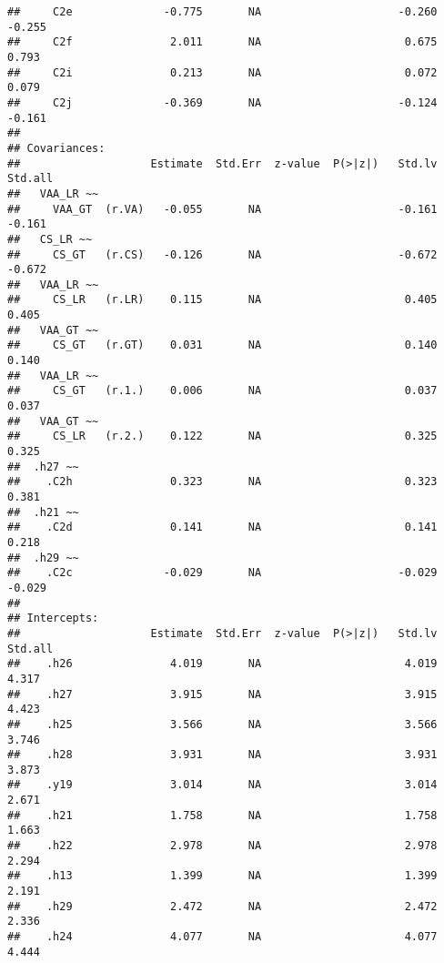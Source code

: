\documentclass[
]{article}
\begin{document}
\begin{verbatim}
##     C2e              -0.775       NA                     -0.260   -0.255
##     C2f               2.011       NA                      0.675    0.793
##     C2i               0.213       NA                      0.072    0.079
##     C2j              -0.369       NA                     -0.124   -0.161
## 
## Covariances:
##                    Estimate  Std.Err  z-value  P(>|z|)   Std.lv  Std.all
##   VAA_LR ~~                                                             
##     VAA_GT  (r.VA)   -0.055       NA                     -0.161   -0.161
##   CS_LR ~~                                                              
##     CS_GT   (r.CS)   -0.126       NA                     -0.672   -0.672
##   VAA_LR ~~                                                             
##     CS_LR   (r.LR)    0.115       NA                      0.405    0.405
##   VAA_GT ~~                                                             
##     CS_GT   (r.GT)    0.031       NA                      0.140    0.140
##   VAA_LR ~~                                                             
##     CS_GT   (r.1.)    0.006       NA                      0.037    0.037
##   VAA_GT ~~                                                             
##     CS_LR   (r.2.)    0.122       NA                      0.325    0.325
##  .h27 ~~                                                                
##    .C2h               0.323       NA                      0.323    0.381
##  .h21 ~~                                                                
##    .C2d               0.141       NA                      0.141    0.218
##  .h29 ~~                                                                
##    .C2c              -0.029       NA                     -0.029   -0.029
## 
## Intercepts:
##                    Estimate  Std.Err  z-value  P(>|z|)   Std.lv  Std.all
##    .h26               4.019       NA                      4.019    4.317
##    .h27               3.915       NA                      3.915    4.423
##    .h25               3.566       NA                      3.566    3.746
##    .h28               3.931       NA                      3.931    3.873
##    .y19               3.014       NA                      3.014    2.671
##    .h21               1.758       NA                      1.758    1.663
##    .h22               2.978       NA                      2.978    2.294
##    .h13               1.399       NA                      1.399    2.191
##    .h29               2.472       NA                      2.472    2.336
##    .h24               4.077       NA                      4.077    4.444

\end{verbatim}
\end{document}
